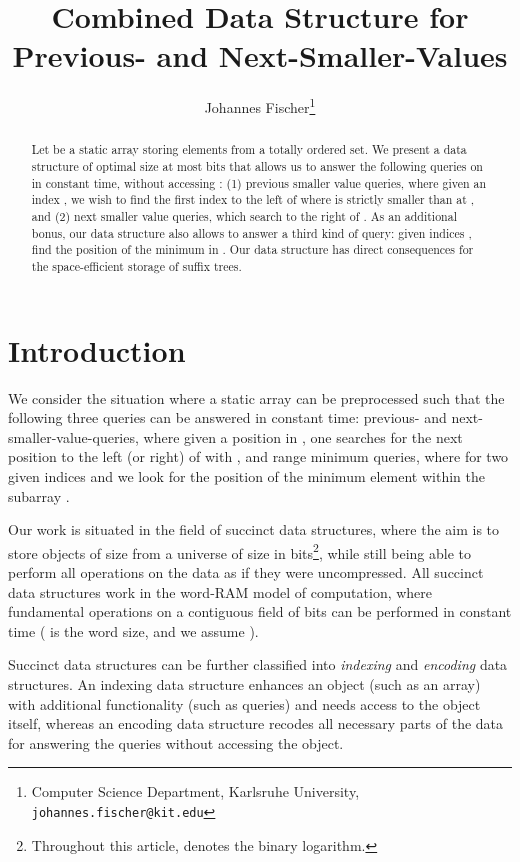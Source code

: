 \documentclass[11pt,onecolumn,final]{article} \usepackage{a4}
\title{Combined Data Structure for Previous- and Next-Smaller-Values}
\author{
  Johannes Fischer\thanks{Computer Science Department, Karlsruhe
    University, \texttt{johannes.fischer@kit.edu}}
}
\date{}
\theoremstyle{plain}
\theoremstyle{remark}
\begin{document}
\maketitle

\begin{abstract}
Let  be a static array storing  elements from a totally ordered set. We present a data structure of optimal size at most  bits that allows us to answer the following queries on  in constant time, without accessing : (1) previous smaller value queries, where given an index , we wish to find the first index to the left of  where  is strictly smaller than at , and (2) next smaller value queries, which search to the right of . As an additional bonus, our data structure also allows to answer a third kind of query: given indices , find the position of the minimum in . Our data structure has direct consequences for the space-efficient storage of suffix trees.
\end{abstract}

\section{Introduction}
We consider the situation where a static array  can be preprocessed such that the following three queries can be answered in constant time: previous- and next-smaller-value-queries, where given a position  in , one searches for the next position  to the left (or right) of  with , and range minimum queries, where for two given indices  and  we look for the position of the minimum element within the subarray .

Our work is situated in the field of succinct data structures, where the aim is to store objects of size  from a universe of size  in  bits\footnote{Throughout this article,  denotes the binary logarithm.}, while still being able to perform all operations on the data as if they were uncompressed. All succinct data structures work in the word-RAM model of computation, where fundamental operations on a contiguous field of  bits can be performed in constant time ( is the word size, and we assume ).

Succinct data structures can be further classified into \emph{indexing} and \emph{encoding} data structures. An indexing data structure enhances an object (such as an array) with additional functionality (such as queries) and needs access to the object itself, whereas an encoding data structure recodes all necessary parts of the data for answering the queries without accessing the object.
\end{document}
